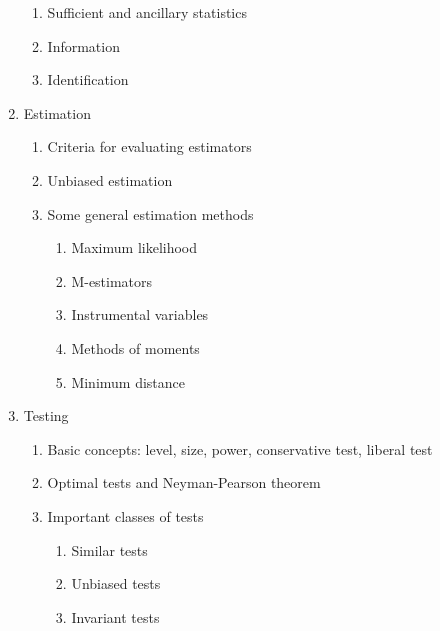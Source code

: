 \documentclass[titlepage,11pt,amstex]{article}
\begin{document}
\begin{enumerate}
\begin{enumerate}
\item Sufficient and ancillary statistics

\item Information

\item Identification
\end{enumerate}

\item Estimation

\begin{enumerate}
\item Criteria for evaluating estimators

\item Unbiased estimation

\item Some general estimation methods

\begin{enumerate}
\item Maximum likelihood

\item M-estimators

\item Instrumental variables

\item Methods of moments

\item Minimum distance
\end{enumerate}
\end{enumerate}

\item Testing

\begin{enumerate}
\item Basic concepts: level, size, power, conservative test, liberal test

\item Optimal tests and Neyman-Pearson theorem

\item Important classes of tests

\begin{enumerate}
\item Similar tests

\item Unbiased tests

\item Invariant tests
\end{enumerate}


\end{enumerate}
\end{enumerate}
\end{document}
